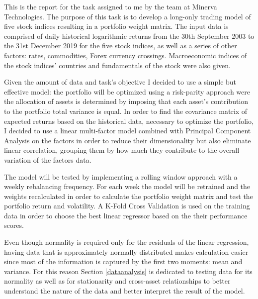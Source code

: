 


This is the report for the task assigned to me by the team at Minerva Technologies. The purpose of this task is to develop a long-only trading model of five stock indices resulting in a portfolio weight matrix. The input data is comprised of daily historical logarithmic returns from the 30th September 2003 to the 31st December 2019 for the five stock indices, as well as a series of other factors: rates, commodities, Forex currency crossings. Macroeconomic indices of the stock indices' countries and fundamentals of the stock were also given.

Given the amount of data and task's objective I decided to use a simple but effective model: the portfolio will be optimized using a risk-parity approach were the allocation of assets is determined by imposing that each asset's contribution to the portfolio total variance is equal. In order to find the covariance matrix of expected returns based on the historical data, necessary to optimize the portfolio, I decided to use a linear multi-factor model combined with Principal Component Analysis on the factors in order to reduce their dimensionality but also eliminate linear correlation, grouping them by how much they contribute to the overall variation of the factors data.

The model will be tested by implementing a rolling window approach with a weekly rebalancing frequency. For each week the model will be retrained and the weights recalculated in order to calculate the portfolio weight matrix and test the portfolio return and volatility. A K-Fold Cross Validation is used on the training data in order to choose the best linear regressor based on the their performance scores.


Even though normality is required only for the residuals of the linear regression, having data that is approximately normally distributed makes calculation easier since most of the information is captured by the first two moments: mean and variance. For this reason Section \ref{dataanalysis} is dedicated to testing data for its normality as well as for stationarity and cross-asset relationships to better understand the nature of the data and better interpret the result of the model.
